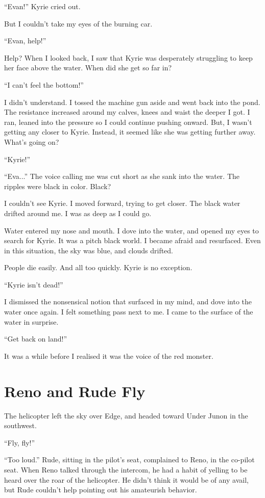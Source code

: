 \documentclass[oneside]{book}
\begin{document}
“Evan!” Kyrie cried out.

But I couldn’t take my eyes of the burning car.

“Evan, help!”

Help? When I looked back, I saw that Kyrie was desperately struggling to keep her face above the water. When did she get so far in?

“I can’t feel the bottom!”

I didn’t understand. I tossed the machine gun aside and went back into the pond. The resistance increased around my calves, knees and waist the deeper I got. I ran, leaned into the pressure so I could continue pushing onward. But, I wasn’t getting any closer to Kyrie. Instead, it seemed like she was getting further away. What’s going on?

“Kyrie!”

“Eva...” The voice calling me was cut short as she sank into the water. The ripples were black in color. Black?

I couldn’t see Kyrie. I moved forward, trying to get closer. The black water drifted around me. I was as deep as I could go.

Water entered my nose and mouth. I dove into the water, and opened my eyes to search for Kyrie. It was a pitch black world. I became afraid and resurfaced. Even in this situation, the sky was blue, and clouds drifted.

People die easily. And all too quickly. Kyrie is no exception.

“Kyrie isn’t dead!”

I dismissed the nonsensical notion that surfaced in my mind, and dove into the water once again. I felt something pass next to me. I came to the surface of the water in surprise.

“Get back on land!”

It was a while before I realised it was the voice of the red monster.

\chapter{Reno and Rude Fly}
The helicopter left the sky over Edge, and headed toward Under Junon in the southwest.

“Fly, fly!”

“Too loud.” Rude, sitting in the pilot’s seat, complained to Reno, in the co-pilot seat. When Reno talked through the intercom, he had a habit of yelling to be heard over the roar of the helicopter. He didn’t think it would be of any avail, but Rude couldn’t help pointing out his amateurish behavior.
\end{document}
